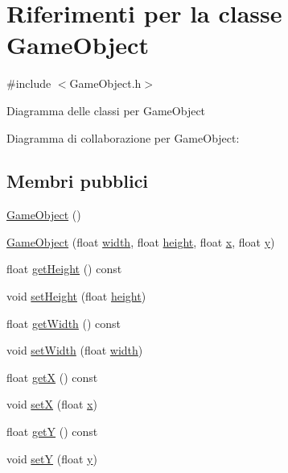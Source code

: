 \hypertarget{class_game_object}{}\section{Riferimenti per la classe Game\+Object}
\label{class_game_object}


{\ttfamily \#include $<$Game\+Object.\+h$>$}



Diagramma delle classi per Game\+Object


Diagramma di collaborazione per Game\+Object\+:
\subsection*{Membri pubblici}
\begin{DoxyCompactItemize}
\item 
\hyperlink{class_game_object_a0348e3ee2e83d56eafca7a3547f432c4}{Game\+Object} ()
\item 
\hyperlink{class_game_object_aacbfc590fef88ae437762c2faa17387b}{Game\+Object} (float \hyperlink{class_game_object_af797cec05ff1d3cbc694fc7036add37b}{width}, float \hyperlink{class_game_object_a0ae9c255f47b6148c26d0333a72d0625}{height}, float \hyperlink{class_game_object_ad4976cd29785cf9bd791148ff397c41e}{x}, float \hyperlink{class_game_object_a9ac54f1c686ecf5656139a829ed62041}{y})
\item 
float \hyperlink{class_game_object_a927400453a0989e2f5b765031f4d861c}{get\+Height} () const
\item 
void \hyperlink{class_game_object_acaaf4a9eb1f8a86341619948608535d3}{set\+Height} (float \hyperlink{class_game_object_a0ae9c255f47b6148c26d0333a72d0625}{height})
\item 
float \hyperlink{class_game_object_a665147ee46e9b62442b2d6b9835c4dd4}{get\+Width} () const
\item 
void \hyperlink{class_game_object_a1cbfb2faa92685d4d5ed5657f3a9c098}{set\+Width} (float \hyperlink{class_game_object_af797cec05ff1d3cbc694fc7036add37b}{width})
\item 
float \hyperlink{class_game_object_abe61df236efb58849b29d242d87fc59f}{getX} () const
\item 
void \hyperlink{class_game_object_aeab4f4a744cb428a7e6ed191bf65b9a9}{setX} (float \hyperlink{class_game_object_ad4976cd29785cf9bd791148ff397c41e}{x})
\item 
float \hyperlink{class_game_object_a3f55728263b9ce2407459d14b9861b04}{getY} () const
\item 
void \hyperlink{class_game_object_a4b12632d8662822440aa2f8a4b1b2002}{setY} (float \hyperlink{class_game_object_a9ac54f1c686ecf5656139a829ed62041}{y})
\end{DoxyCompactItemize}
